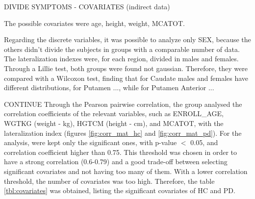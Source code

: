 \documentclass[]{article}
\begin{document}
\begin{multicols}{2}
DIVIDE SYMPTOMS - COVARIATES (indirect data)


The possible covariates were age, height, weight, MCATOT.

Regarding the discrete variables, it was possible to analyze only SEX, because the others didn't divide the subjects in groups with a comparable number of data. 
The lateralization indexes were, for each region, divided in males and females. Through a Lillie test, both groups were found not gaussian. Therefore, they were compared with a Wilcoxon test, finding that for Caudate males and females have different distributions, for Putamen ..., while for Putamen Anterior ... 


CONTINUE
Through the Pearson pairwise correlation, the group analysed the correlation coefficients of the relevant variables, such as ENROLL\_AGE, WGTKG (weight - kg), HGTCM (height - cm), and MCATOT, with the lateralization index (figures \ref{fig:corr_mat_hc} and \ref{fig:corr_mat_pd}). For the analysis, were kept only the significant ones, with p-value $<$ 0.05, and correlation coefficient higher than 0.75. This threshold was chosen in order to have a strong correlation (0.6-0.79) and a good trade-off between selecting significant covariates and not having too many of them. With a lower correlation threshold, the number of covariates was too high. Therefore, the table \ref{tbl:covariates} was obtained, listing the significant covariates of HC and PD.

\end{multicols}
\end{document}
